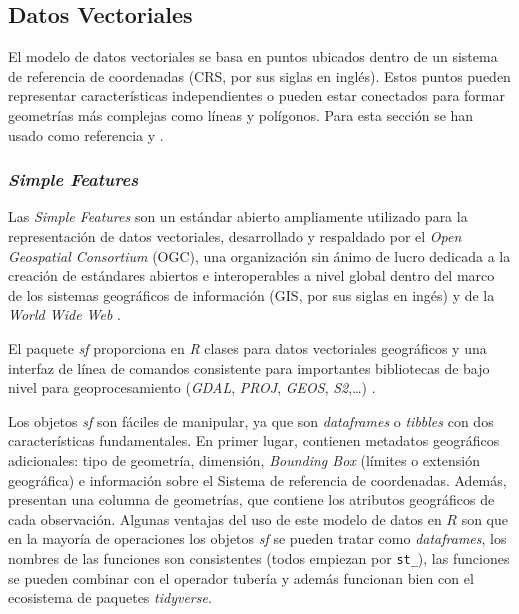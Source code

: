\documentclass[12pt,a4paper,]{book}
\numberwithin{dummy}{section}
\theoremstyle{ocrenumbox}
\theoremstyle{blacknumex}
\theoremstyle{blacknumbox}
\theoremstyle{ocrenum}
\theoremstyle{ocrenum}
\begin{document}
\hypertarget{datos-vectoriales}{%
\subsection{Datos Vectoriales}\label{datos-vectoriales}}

El modelo de datos vectoriales se basa en puntos ubicados dentro de un
sistema de referencia de coordenadas (CRS, por sus siglas en inglés).
Estos puntos pueden representar características independientes o pueden
estar conectados para formar geometrías más complejas como líneas y
polígonos. Para esta sección se han usado como referencia
\citet{lovelace_geocomputation_2019} y \citet{introGISGimond}.

\hypertarget{simple-features}{%
\subsubsection*{\texorpdfstring{\emph{Simple
Features}}{Simple Features}}\label{simple-features}}

Las \emph{Simple Features} son un estándar abierto ampliamente utilizado
para la representación de datos vectoriales, desarrollado y respaldado
por el \emph{Open Geospatial Consortium} (OGC), una organización sin
ánimo de lucro dedicada a la creación de estándares abiertos e
interoperables a nivel global dentro del marco de los sistemas
geográficos de información (GIS, por sus siglas en ingés) y de la
\emph{World Wide Web} \citep{OCGweb}.

El paquete \emph{sf} proporciona en \emph{R} clases para datos
vectoriales geográficos y una interfaz de línea de comandos consistente
para importantes bibliotecas de bajo nivel para geoprocesamiento
(\emph{GDAL}, \emph{PROJ}, \emph{GEOS}, \emph{S2},\ldots)
\citep{sfpackage}.

Los objetos \emph{sf} son fáciles de manipular, ya que son
\emph{dataframes} o \emph{tibbles} con dos características
fundamentales. En primer lugar, contienen metadatos geográficos
adicionales: tipo de geometría, dimensión, \emph{Bounding Box} (límites
o extensión geográfica) e información sobre el Sistema de referencia de
coordenadas. Además, presentan una columna de geometrías, que contiene
los atributos geográficos de cada observación. Algunas ventajas del uso
de este modelo de datos en \(R\) son que en la mayoría de operaciones
los objetos \emph{sf} se pueden tratar como \emph{dataframes}, los
nombres de las funciones son consistentes (todos empiezan por
\texttt{st\_}), las funciones se pueden combinar con el operador tubería
y además funcionan bien con el ecosistema de paquetes \emph{tidyverse}.
\end{document}

